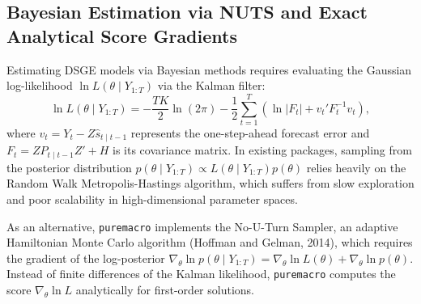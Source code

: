 \documentclass[11pt,letterpaper]{article}
\renewcommand{\_}{\pmunderscore\allowbreak}
\begin{document}
\subsection{Bayesian Estimation via NUTS and Exact Analytical Score Gradients}\label{bayesian-estimation-via-nuts-and-exact-analytical-score-gradients}

Estimating DSGE models via Bayesian methods requires evaluating the Gaussian log-likelihood \(\ln L(\theta \mid Y_{1:T})\) via the Kalman filter:
\[\ln L(\theta \mid Y_{1:T}) = -\frac{T K}{2} \ln(2\pi) - \frac{1}{2} \sum_{t=1}^T \left( \ln |F_t| + v_t' F_t^{-1} v_t \right),\]
where \(v_t = Y_t - Z \hat{s}_{t \mid t-1}\) represents the one-step-ahead forecast error and \(F_t = Z P_{t \mid t-1} Z' + H\) is its covariance matrix. In existing packages, sampling from the posterior distribution \(p(\theta \mid Y_{1:T}) \propto L(\theta \mid Y_{1:T}) p(\theta)\) relies heavily on the Random Walk Metropolis-Hastings algorithm, which suffers from slow exploration and poor scalability in high-dimensional parameter spaces.

As an alternative, \texttt{puremacro} implements the No-U-Turn Sampler, an adaptive Hamiltonian Monte Carlo algorithm (Hoffman and Gelman, 2014), which requires the gradient of the log-posterior \(\nabla_\theta \ln p(\theta \mid Y_{1:T}) = \nabla_\theta \ln L(\theta) + \nabla_\theta \ln p(\theta)\). Instead of finite differences of the Kalman likelihood, \texttt{puremacro} computes the score \(\nabla_\theta \ln L\) analytically for first-order solutions.
\end{document}

